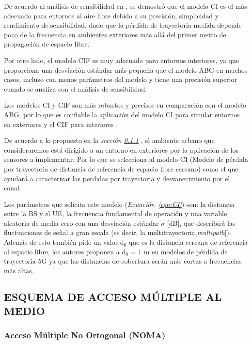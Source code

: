 De acuerdo al análisis de sensibilidad en \parencite{Sun2016}, se demostró que el modelo CI es el más adecuado para entornos al aire libre debido a su precisión, simplicidad y rendimiento de sensibilidad, dado que la pérdida de trayectoria medida depende poco de la frecuencia en ambientes exteriores más allá del primer metro de propagación de espacio libre.\newline

Por otro lado, el modelo CIF es muy adecuado para entornos interiores, ya que proporciona una desviación estándar más pequeña que el modelo ABG en muchos casos, incluso con menos parámetros del modelo y tiene una precisión superior cuando se analiza con el análisis de sensibilidad.\newline

Los modelos CI y CIF son más robustos y precisos en comparación con el modelo ABG, por lo que es confiable la aplicación del modelo CI para simular entornos en exteriores y el CIF para interiores \parencite{Sun2016}.\newline

De acuerdo a lo propuesto en la \textit{sección \ref{} }, el ambiente urbano que consideraremos está dirigido a un entorno en exteriores por la aplicación de los sensores a implementar. Por lo que se selecciona al modelo CI (Modelo de pérdida por trayectoria de distancia de referencia de espacio libre cercano) como el que ayudará a caracterizar las perdidas por trayectoria y desvanecimiento por el canal. 

Los parámetros que solicita este modelo (\textit{Ecuación~\ref{eqn:CI}}) son: la distancia entre la BS y el UE, la frecuencia fundamental de operación y una variable aleatoria de media cero con una desviación estándar $\sigma$ [dB], que describirá las fluctuaciones de señal a gran escala (es decir, la multitrayectoria[\textit{multipath}]). Además de esto también pide un valor d${}_{0}$ que es la distancia cercana de referencia al espacio libre, los autores proponen a d${}_{0}$ = 1 m en modelos de pérdida de trayectoria 5G ya que las distancias de cobertura serán más cortas a frecuencias más altas. 

\subsection{ESQUEMA DE ACCESO MÚLTIPLE AL MEDIO}

\subsubsection{Acceso Múltiple No Ortogonal (NOMA)}

